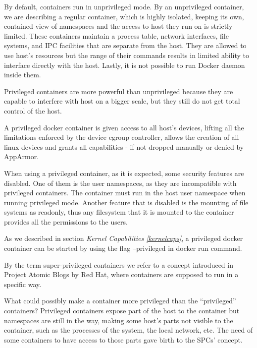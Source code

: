 \begin{description}[style=nextline]
\item[Unprivileged containers]
By default, containers run in unprivileged mode. By an unprivileged container, we are describing a regular container, which is highly isolated, keeping its own, contained view of namespaces and the access to host they run on is strictly limited. These containers maintain a process table, network interfaces, file systems, and IPC facilities that are separate from the host. They are allowed to use host's resources
but the range of their commands results in limited ability to interface directly with the host. Lastly, it is not possible to run Docker daemon inside them. \cite{redhatspc}

\item[Privileged containers]
Privileged containers are more powerful than unprivileged because they are capable to interfere with host on a bigger scale, but they still do not get total control of the host.

A privileged docker container is given access to all host's devices, lifting all the limitations enforced by the device cgroup controller, allows the creation of all linux devices and grants all capabilities - if not dropped manually or denied by AppArmor.

When using a privileged container, as it is expected, some security features are disabled. One of them is the user namespaces, as they are incompatible with privileged containers. The container must run in the host user namespace when running privileged mode. Another feature that is disabled is the mounting of file systems as readonly, thus any filesystem that it is mounted to the container provides all the permissions to the users.

As we described in section \textit{Kernel Capabilities \ref{kernelcaps}}, a privileged docker container can be started by using the flag --privileged in docker run command.

\item[Super-Privileged Containers]
By the term super-privileged containers we refer to a concept introduced in Project Atomic Blogs by Red Hat, where containers are supposed to run in a specific way. \cite{troubledocker}

What could possibly make a container more privileged than the “privileged” containers? Privileged containers expose part of the host to the container but namespaces are still in the way, making some host's parts not visible to the container, such as the processes of the system, the local network, etc. The need of some containers to have access to those parts gave birth to the SPCs' concept.


\end{description}
